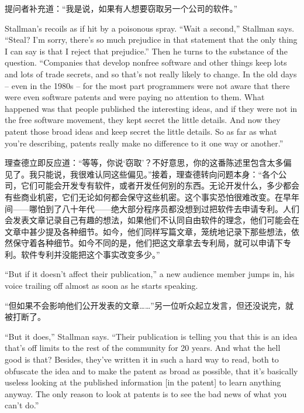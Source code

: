 \ifdefined\chs
提问者补充道：“我是说，如果有人想要窃取另一个公司的软件。”
\fi

\ifdefined\eng
Stallman's recoils as if hit by a poisonous spray. ``Wait a second,'' Stallman says. ``Steal? I'm sorry, there's so much prejudice in that statement that the only thing I can say is that I reject that prejudice.'' Then he turns to the substance of the question. ``Companies that develop nonfree software and other things keep lots and lots of trade secrets, and so that's not really likely to change. In the old days -- even in the 1980s -- for the most part programmers were not aware that there were even software patents and were paying no attention to them. What happened was that people published the interesting ideas, and if they were not in the free software movement, they kept secret the little details. And now they patent those broad ideas and keep secret the little details. So as far as what you're describing, patents really make no difference to it one way or another.''
\fi

\ifdefined\chs
理查德立即反应道：“等等，你说‘窃取’？不好意思，你的这番陈述里包含太多偏见了。我只能说，我很难认同这些偏见。”接着，理查德转向问题本身：“各个公司，它们可能会开发专有软件，或者开发任何别的东西。无论开发什么，多少都会有些商业机密，它们无论如何都会保守这些机密。这个事实恐怕很难改变。在早年间——哪怕到了八十年代——绝大部分程序员都没想到过把软件去申请专利。人们会发表文章记录自己有趣的想法，如果他们不认同自由软件的理念，他们可能会在文章中甚少提及各种细节。如今，他们同样写篇文章，笼统地记录下那些想法，依然保守着各种细节。如今不同的是，他们把这文章拿去专利局，就可以申请下专利。软件专利并没能把这个事实改变多少。”
\fi

\ifdefined\eng
``But if it doesn't affect their publication,'' a new audience member jumps in, his voice trailing off almost as soon as he starts speaking.
\fi

\ifdefined\chs
“但如果不会影响他们公开发表的文章……”另一位听众起立发言，但还没说完，就被打断了。
\fi

\ifdefined\eng
``But it does,'' Stallman says. ``Their publication is telling you that this is an idea that's off limits to the rest of the community for 20 years. And what the hell good is that? Besides, they've written it in such a hard way to read, both to obfuscate the idea and to make the patent as broad as possible, that it's basically useless looking at the published information [in the patent] to learn anything anyway. The only reason to look at patents is to see the bad news of what you can't do.''
\fi

